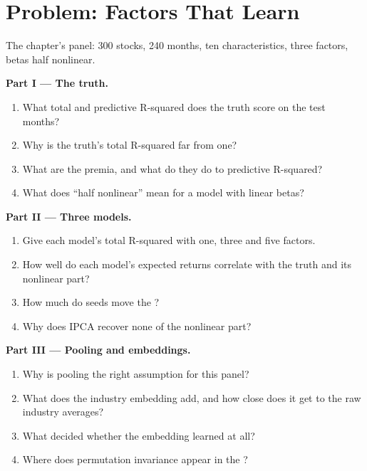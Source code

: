 \section{Problem: Factors That Learn}

\begin{problem}\label{pb:ml:cross-sectional-deep-models:1}
The chapter's panel: 300 stocks, 240 months, ten characteristics, three factors, betas half nonlinear.

\medskip\noindent\textbf{Part I --- The truth.}
\begin{enumerate}
\item What total and predictive R-squared does the truth score on the test months?
\item Why is the truth's total R-squared far from one?
\item What are the premia, and what do they do to predictive R-squared?
\item What does ``half nonlinear'' mean for a model with linear betas?
\end{enumerate}

\medskip\noindent\textbf{Part II --- Three models.}
\begin{enumerate}[resume]
\item Give each model's total R-squared with one, three and five factors.
\item How well do each model's expected returns correlate with the truth and its nonlinear part?
\item How much do seeds move the ?
\item Why does IPCA recover none of the nonlinear part?
\end{enumerate}

\medskip\noindent\textbf{Part III --- Pooling and embeddings.}
\begin{enumerate}[resume]
\item Why is pooling the right assumption for this panel?
\item What does the industry embedding add, and how close does it get to the raw industry averages?
\item What decided whether the embedding learned at all?
\item Where does permutation invariance appear in the ?
\end{enumerate}


\end{problem}
